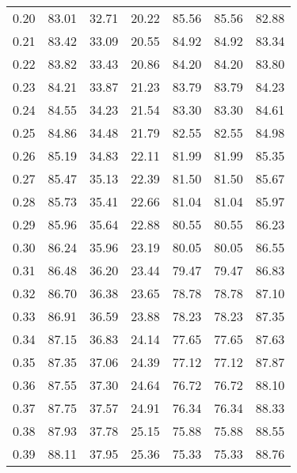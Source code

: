 \begin{tabular}{|c|c|c|c|c|c|c|}
      0.20 &     83.01 &     32.71 &      20.22 &   85.56 &      85.56 &         82.88 \\
      0.21 &     83.42 &     33.09 &      20.55 &   84.92 &      84.92 &         83.34 \\
      0.22 &     83.82 &     33.43 &      20.86 &   84.20 &      84.20 &         83.80 \\
      0.23 &     84.21 &     33.87 &      21.23 &   83.79 &      83.79 &         84.23 \\
      0.24 &     84.55 &     34.23 &      21.54 &   83.30 &      83.30 &         84.61 \\
      0.25 &     84.86 &     34.48 &      21.79 &   82.55 &      82.55 &         84.98 \\
      0.26 &     85.19 &     34.83 &      22.11 &   81.99 &      81.99 &         85.35 \\
      0.27 &     85.47 &     35.13 &      22.39 &   81.50 &      81.50 &         85.67 \\
      0.28 &     85.73 &     35.41 &      22.66 &   81.04 &      81.04 &         85.97 \\
      0.29 &     85.96 &     35.64 &      22.88 &   80.55 &      80.55 &         86.23 \\
      0.30 &     86.24 &     35.96 &      23.19 &   80.05 &      80.05 &         86.55 \\
      0.31 &     86.48 &     36.20 &      23.44 &   79.47 &      79.47 &         86.83 \\
      0.32 &     86.70 &     36.38 &      23.65 &   78.78 &      78.78 &         87.10 \\
      0.33 &     86.91 &     36.59 &      23.88 &   78.23 &      78.23 &         87.35 \\
      0.34 &     87.15 &     36.83 &      24.14 &   77.65 &      77.65 &         87.63 \\
      0.35 &     87.35 &     37.06 &      24.39 &   77.12 &      77.12 &         87.87 \\
      0.36 &     87.55 &     37.30 &      24.64 &   76.72 &      76.72 &         88.10 \\
      0.37 &     87.75 &     37.57 &      24.91 &   76.34 &      76.34 &         88.33 \\
      0.38 &     87.93 &     37.78 &      25.15 &   75.88 &      75.88 &         88.55 \\
      0.39 &     88.11 &     37.95 &      25.36 &   75.33 &      75.33 &         88.76 \\

\end{tabular}
